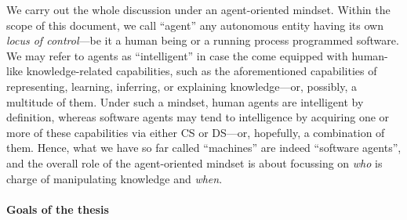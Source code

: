 \documentclass[12pt,a4paper,openright,twoside]{book}
\begin{document}
We carry out the whole discussion under an agent-oriented mindset.
%
Within the scope of this document, we call ``agent'' any autonomous entity having its own \emph{locus of control}---be it a human being or a running process programmed software.
%
We may refer to agents as ``intelligent'' in case the come equipped with human-like knowledge-related capabilities, such as the aforementioned capabilities of representing, learning, inferring, or explaining knowledge---or, possibly, a multitude of them.
%
Under such a mindset, human agents are intelligent by definition, whereas software agents may tend to intelligence by acquiring one or more of these capabilities via either CS or DS---or, hopefully, a combination of them.
%
Hence, what we have so far called ``machines'' are indeed ``software agents'', and the overall role of the agent-oriented mindset is about focussing on \emph{who} is charge of manipulating knowledge and \emph{when}. %

\paragraph{Goals of the thesis}
\end{document}

